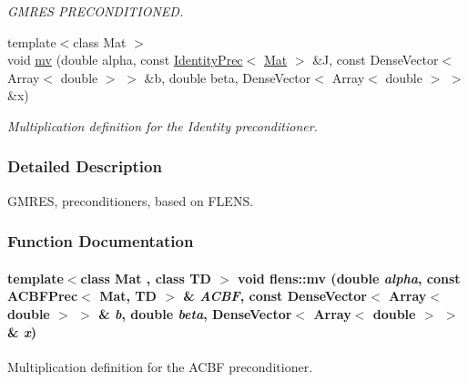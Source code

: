 \begin{CompactItemize}
\begin{CompactList}\small\item\em GMRES PRECONDITIONED. \item\end{CompactList}\item 
{\footnotesize template$<$class Mat $>$ }\\void \hyperlink{namespaceflens_84086cd2974976c7b90f661e592c0fae}{mv} (double alpha, const \hyperlink{classflens_1_1IdentityPrec}{IdentityPrec}$<$ \hyperlink{Traits_8hpp_b349a67c16cc4a221c94f5bb1fa77da5}{Mat} $>$ \&J, const DenseVector$<$ Array$<$ double $>$ $>$ \&b, double beta, DenseVector$<$ Array$<$ double $>$ $>$ \&x)
\begin{CompactList}\small\item\em Multiplication definition for the Identity preconditioner. \item\end{CompactList}\end{CompactItemize}


\subsubsection{Detailed Description}
GMRES, preconditioners, based on FLENS. 



\subsubsection{Function Documentation}
\hypertarget{namespaceflens_981e54f9a00c100ae67795a084157991}{
\paragraph[{mv}]{\setlength{\rightskip}{0pt plus 5cm}template$<$class Mat , class TD $>$ void flens::mv (double {\em alpha}, \/  const {\bf ACBFPrec}$<$ {\bf Mat}, TD $>$ \& {\em ACBF}, \/  const DenseVector$<$ Array$<$ double $>$ $>$ \& {\em b}, \/  double {\em beta}, \/  DenseVector$<$ Array$<$ double $>$ $>$ \& {\em x})}\hfill}
\label{namespaceflens_981e54f9a00c100ae67795a084157991}


Multiplication definition for the ACBF preconditioner. 

